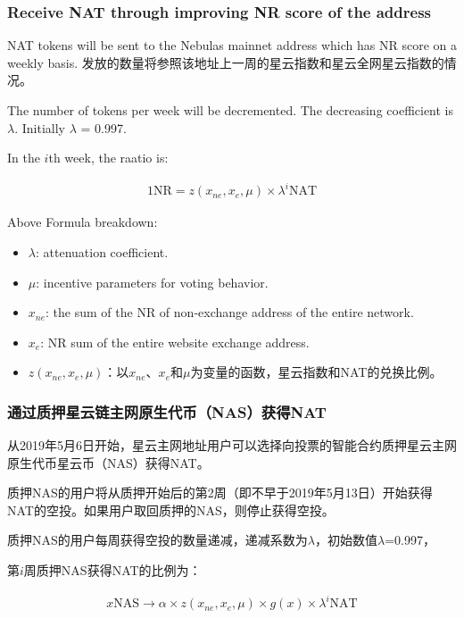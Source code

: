 \subsubsection{Receive NAT through improving NR score of the address}

NAT tokens will be sent to the Nebulas mainnet address which has NR score on a weekly basis. 发放的数量将参照该地址上一周的星云指数和星云全网星云指数的情况。

The number of tokens per week will be decremented. The decreasing coefficient is $\lambda$. Initially $\lambda$ = 0.997.

In the $i$th week, the raatio is:

\begin{align}
1 \text{NR}=z(x_{ne},x_{e},\mu)\times\lambda^{i} \text{NAT}
\end{align} 

Above Formula breakdown:

\begin{itemize}
	\item $\lambda$: attenuation coefficient.
	\item $\mu$: incentive parameters for voting behavior.
	\item $x_{ne}$: the sum of the NR of non-exchange address of the entire network.
	\item $x_{e}$: NR sum of the entire website exchange address.
	\item $z(x_{ne},x_{e},\mu)$：以$x_{ne}$、$x_{e}$和$\mu$为变量的函数，星云指数和NAT的兑换比例。
\end{itemize}

\subsubsection{通过质押星云链主网原生代币（NAS）获得NAT}

从2019年5月6日开始，星云主网地址用户可以选择向投票的智能合约质押星云主网原生代币星云币（NAS）获得NAT。

质押NAS的用户将从质押开始后的第2周（即不早于2019年5月13日）开始获得NAT的空投。如果用户取回质押的NAS，则停止获得空投。

质押NAS的用户每周获得空投的数量递减，递减系数为$\lambda$，初始数值$\lambda$=0.997，

第$i$周质押NAS获得NAT的比例为： 

\begin{align}
x \text{NAS} \rightarrow \alpha \times z(x_{ne},x_{e},\mu)\times g(x) \times \lambda^{i} \text{NAT}
\end{align}

